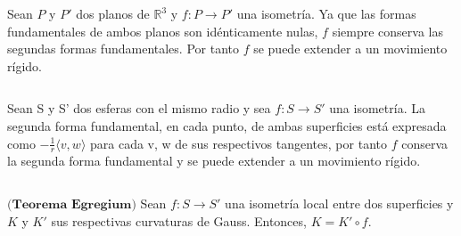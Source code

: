 \begin{ejemplo}
		Sean $P$ y $P'$ dos planos de $\mathbb{R}^3$ y $f : P \to P'$ una isometría. Ya que las formas fundamentales de ambos planos son idénticamente nulas, $f$ siempre conserva las segundas formas fundamentales. Por tanto $f$ se puede extender a un movimiento rígido.
\end{ejemplo}
${ }$\\

\begin{ejemplo}
	Sean S y S' dos esferas con el mismo radio y sea $f : S \to S'$ una isometría. La segunda forma fundamental, en cada punto, de ambas superficies está expresada como $-\frac{1}{r} \langle v,w \rangle$ para cada v, w de sus respectivos tangentes, por tanto $f$ conserva la segunda forma fundamental y se puede extender a un movimiento rígido.
\end{ejemplo}
${ }$\\

\begin{teorema} \label{teo:egre}
	$\textbf{(Teorema Egregium)}$ Sean $f : S \to S'$ una isometría local entre dos superficies y $K$ y $K'$ sus respectivas curvaturas de Gauss. Entonces, $K = K'\circ f$.
\end{teorema}

